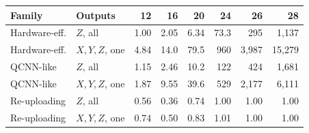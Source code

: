 \begin{tabular}{llrrrrrr}
\toprule
Family & Outputs & 12 & 16 & 20 & 24 & 26 & 28\\
\midrule
Hardware-eff. & $Z$, all & 1.00 & 2.05 & 6.34 & 73.3 & 295 & 1{,}137\\
Hardware-eff. & $X,Y,Z$, one & 4.84 & 14.0 & 79.5 & 960 & 3{,}987 & 15{,}279\\
QCNN-like & $Z$, all & 1.15 & 2.46 & 10.2 & 122 & 424 & 1{,}681\\
QCNN-like & $X,Y,Z$, one & 1.87 & 9.55 & 39.6 & 529 & 2{,}177 & 6{,}111\\
Re-uploading & $Z$, all & 0.56 & 0.36 & 0.74 & 1.00 & 1.00 & 1.00\\
Re-uploading & $X,Y,Z$, one & 0.74 & 0.50 & 0.83 & 1.01 & 1.00 & 1.00\\
\bottomrule
\end{tabular}
